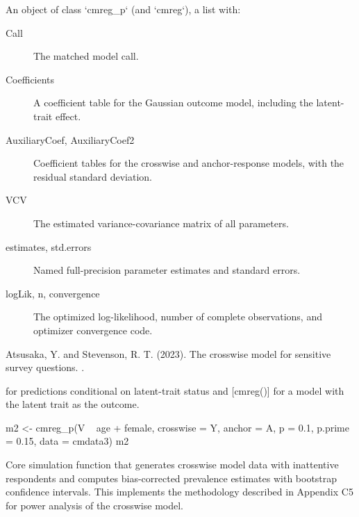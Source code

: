 \documentclass[a4paper]{book}
\begin{document}
%
\begin{Value}
An object of class `cmreg\_p` (and `cmreg`), a list with:
\begin{description}

\item[Call] The matched model call.
\item[Coefficients] A coefficient table for the Gaussian outcome model,
including the latent-trait effect.
\item[AuxiliaryCoef, AuxiliaryCoef2] Coefficient tables for the crosswise
and anchor-response models, with the residual standard deviation.
\item[VCV] The estimated variance-covariance matrix of all parameters.
\item[estimates, std.errors] Named full-precision parameter estimates and
standard errors.
\item[logLik, n, convergence] The optimized log-likelihood, number of
complete observations, and optimizer convergence code.

\end{description}

\end{Value}
%
\begin{References}
Atsusaka, Y. and Stevenson, R. T. (2023). The crosswise model
for sensitive survey questions. .
\end{References}
%
\begin{SeeAlso}
[cmpredict\_p()] for predictions conditional on latent-trait status
and [cmreg()] for a model with the latent trait as the outcome.
\end{SeeAlso}
%
\begin{Examples}
\begin{ExampleCode}
m2 <- cmreg_p(V ~ age + female, crosswise = Y, anchor = A, p = 0.1,
              p.prime = 0.15, data = cmdata3)
m2
\end{ExampleCode}
\end{Examples}
%
\begin{Description}
Core simulation function that generates crosswise model data with inattentive
respondents and computes bias-corrected prevalence estimates with bootstrap
confidence intervals. This implements the methodology described in Appendix C5
for power analysis of the crosswise model.
\end{Description}
\end{document}
